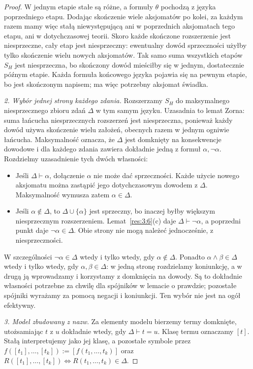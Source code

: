 \begin{proof}
W jednym etapie stałe są różne, a formuły $\theta$ pochodzą z języka poprzedniego etapu. Dodając skończenie wiele aksjomatów po kolei, za każdym razem mamy więc stałą niewystępującą ani w poprzednich aksjomatach tego etapu, ani w dotychczasowej teorii. Skoro każde skończone rozszerzenie jest niesprzeczne, cały etap jest niesprzeczny: ewentualny dowód sprzeczności użyłby tylko skończenie wielu nowych aksjomatów. Tak samo suma wszystkich etapów $S_H$ jest niesprzeczna, bo skończony dowód mieściłby się w jednym, dostatecznie późnym etapie. Każda formuła końcowego języka pojawia się na pewnym etapie, bo jest skończonym napisem; ma więc potrzebny aksjomat świadka.

\emph{2. Wybór jednej strony każdego zdania.} Rozszerzamy $S_H$ do maksymalnego niesprzecznego zbioru zdań $\Delta$ w tym samym języku. Uzasadnia to lemat Zorna: suma łańcucha niesprzecznych rozszerzeń jest niesprzeczna, ponieważ każdy dowód używa skończenie wielu założeń, obecnych razem w jednym ogniwie łańcucha. Maksymalność oznacza, że $\Delta$ jest domknięty na konsekwencje dowodowe i dla każdego zdania zawiera dokładnie jedną z formuł $\alpha,\neg\alpha$. Rozdzielmy uzasadnienie tych dwóch własności:
\begin{itemize}
\item Jeśli $\Delta\vdash\alpha$, dołączenie $\alpha$ nie może dać sprzeczności. Każde użycie nowego aksjomatu można zastąpić jego dotychczasowym dowodem z $\Delta$. Maksymalność wymusza zatem $\alpha\in\Delta$.
\item Jeśli $\alpha\notin\Delta$, to $\Delta\cup\{\alpha\}$ jest sprzeczny, bo inaczej byłby większym niesprzecznym rozszerzeniem. Lemat~\ref{res:3:6}(c) daje $\Delta\vdash\neg\alpha$, a poprzedni punkt daje $\neg\alpha\in\Delta$. Obie strony nie mogą należeć jednocześnie, z niesprzeczności.
\end{itemize}
W szczególności $\neg\alpha\in\Delta$ wtedy i tylko wtedy, gdy $\alpha\notin\Delta$. Ponadto $\alpha\land\beta\in\Delta$ wtedy i tylko wtedy, gdy $\alpha,\beta\in\Delta$: w jedną stronę rozdzielamy koniunkcję, a w drugą ją wprowadzamy i korzystamy z domknięcia na dowody. Są to dokładnie własności potrzebne za chwilę dla spójników w lemacie o prawdzie; pozostałe spójniki wyrażamy za pomocą negacji i koniunkcji. Ten wybór nie jest na ogół efektywny.

\emph{3. Model zbudowany z nazw.} Za elementy modelu bierzemy termy domknięte, utożsamiając $t$ z $u$ dokładnie wtedy, gdy $\Delta\vdash t=u$. Klasę termu oznaczamy $[t]$. Stałą interpretujemy jako jej klasę, a pozostałe symbole przez $f([t_1],\ldots,[t_k]):=[f(t_1,\ldots,t_k)]$ oraz $R([t_1],\ldots,[t_k])\Longleftrightarrow R(t_1,\ldots,t_k)\in\Delta$.


\end{proof}

